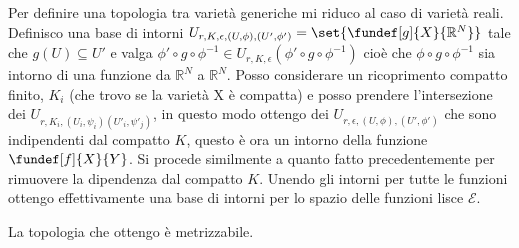 \begin{defn}
Per definire una topologia tra varietà generiche mi riduco al caso di varietà reali.
Definisco una base di intorni $U_{r, K, \epsilon, (U, \phi), (U', \phi')} = \set{\fundef[g]{X}{\mathbb{R}^{N}}}$ tale che $g(U) \subseteq U'$ e valga 
$\phi' \circ g \circ \phi^{-1} \in U_{r, K, \epsilon}(\phi' \circ g \circ \phi^{-1})$ cioè che $\phi \circ g \circ \phi^{-1}$ sia intorno di una funzione da $\mathbb{R}^{N}$ a $\mathbb{R}^{N}$.
Posso considerare un ricoprimento compatto finito,  ${K_i}$ (che trovo se la varietà X è compatta) e posso prendere l'intersezione dei $U_{r,K_i, (U_i, \psi_i)(U'_i, \psi'_j)}$, in questo modo ottengo
dei $U_{r, \epsilon, (U, \phi), (U', \phi')}$ che sono indipendenti dal compatto $K$, questo è ora un intorno della funzione $\fundef[f]{X}{Y}$. Si procede similmente a quanto fatto precedentemente 
per rimuovere la dipendenza dal compatto $K$.
Unendo gli intorni per tutte le funzioni ottengo effettivamente una base di intorni per lo spazio delle funzioni lisce $\mathcal{E}$.

\end{defn}

\begin{oss}
 La topologia che ottengo è metrizzabile.
\end{oss}


